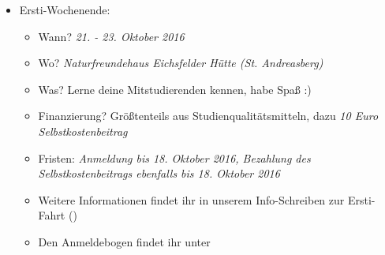 \begin{itemize}
	\item Ersti-Wochenende:
	\begin{itemize}
		\item Wann? \emph{21. - 23. Oktober 2016}
		\item Wo? \emph{Naturfreundehaus Eichsfelder Hütte (St. Andreasberg)}
		\item Was? Lerne deine Mitstudierenden kennen, habe Spaß :)
		\item Finanzierung? Größtenteils aus Studienqualitätsmitteln, dazu \emph{10 Euro Selbstkostenbeitrag}
		\item Fristen: \emph{Anmeldung bis 18. Oktober 2016, Bezahlung des Selbstkostenbeitrags ebenfalls bis 18. Oktober 2016}
		\item Weitere Informationen findet ihr in unserem Info-Schreiben zur Ersti-Fahrt ()
		\item Den Anmeldebogen findet ihr unter 
	\end{itemize}
\end{itemize}